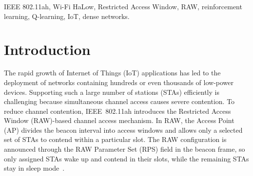 \documentclass[conference]{IEEEtran}
\begin{document}
\begin{abstract}
LACA~\cite{taramit2023laca}, and Chang2019~\cite{chang2019traffic} (a
regression-based traffic-aware grouping scheme) — across
$N \in \{100, 200, 400, 600, 800, 1000\}$.
Multi-episode training fundamentally changes the competitive picture
compared to a single training episode.
At $N=100$, LACA remains dominant (PDR $=1.000$), with trained DQN closest
($0.993$).
From $N=200$ onward, a trained RL variant \emph{exceeds every baseline},
something no architecture achieved with single-episode training: PPO leads
at every density $N \geq 200$ — $0.949$ vs.\ $0.940$ for LACA at $N=200$
($+0.9$\,pp), $0.566$ vs.\ $0.384$ for LACA at $N=400$ ($+18.3$\,pp), $0.417$
vs.\ $0.262$ for static RAW at $N=600$ ($+15.5$\,pp), $0.281$ vs.\ $0.189$ for
static RAW at $N=800$ ($+9.1$\,pp), and $0.210$ vs.\ $0.148$ for static RAW
at $N=1000$ ($+6.3$\,pp).
At $N=100$, PPO is, unusually, the \emph{weakest} RL variant ($0.863$).
Energy efficiency improves correspondingly: Tab-DDQN leads at $N=100$
($61.8$ vs.\ $54.9$ for LACA, $+12.5\,\%$), DDQN leads at $N=200$ ($51.3$
vs.\ $43.3$ for LACA, $+18.6\,\%$), and PPO leads at $N\in\{400,600,800,1000\}$
($34.0$/$24.8$/$15.0$/$10.1$ vs.\ $19.7$/$12.6$/$8.5$/$6.0$ for the best
baseline, i.e.\ $+73$/$+96$/$+76$/$+68\,\%$).
Across a 42-chance win-count tally (7 metrics $\times$ 6 densities),
PPO alone accounts for 28 wins, far ahead of LACA (7), No-RAW (5, mostly
delay artefacts of its near-zero PDR), Tab-DDQN (1), and DDQN (1); tabular
Q-learning, DQN, and static RAW win nothing.
The cost of these PDR/EE gains remains delay: at $N \geq 400$, the best RL
delay is $38$--$176\,\%$ higher than No-RAW's artificially low value, growing
with $N$.
\end{abstract}

\begin{IEEEkeywords}
IEEE 802.11ah, Wi-Fi HaLow, Restricted Access Window, RAW,
reinforcement learning, Q-learning, IoT, dense networks.
\end{IEEEkeywords}

\section{Introduction}

The rapid growth of Internet of Things (IoT) applications has led to the
deployment of networks containing hundreds or even thousands of low-power
devices.
Supporting such a large number of stations (STAs) efficiently is challenging
because simultaneous channel access causes severe contention.
To reduce channel contention, IEEE~802.11ah introduces the Restricted Access
Window (RAW)-based channel access mechanism.
In RAW, the Access Point (AP) divides the beacon interval into access windows
and allows only a selected set of STAs to contend within a particular slot.
The RAW configuration is announced through the RAW Parameter Set (RPS) field
in the beacon frame, so only assigned STAs wake up and contend in their slots,
while the remaining STAs stay in sleep mode~\cite{std80211ah}.
\end{document}
